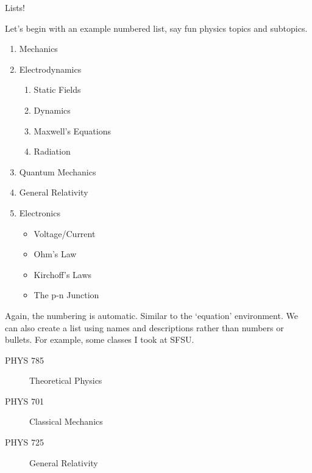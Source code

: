 \documentclass{article}
\begin{document}
Lists!

Let's begin with an example numbered list, say fun physics topics and subtopics.

\begin{enumerate}
\item Mechanics
\item Electrodynamics
	\begin{enumerate}
	\item Static Fields
	\item Dynamics
	\item Maxwell's Equations
	\item Radiation
	\end{enumerate}
\item Quantum Mechanics
\item General Relativity
\item Electronics
	\begin{itemize}
	\item Voltage/Current
	\item Ohm's Law
	\item Kirchoff's Laws
	\item The p-n Junction
	\end{itemize}
\end{enumerate}

Again, the numbering is automatic.  Similar to the `equation' environment.  We can also create a list using names and descriptions rather than numbers or bullets.  For example, some classes I took at SFSU.

\begin{description}
\item[PHYS 785] Theoretical Physics
\item[PHYS 701] Classical Mechanics
\item[PHYS 725] General Relativity
\end{description}
\end{document}
